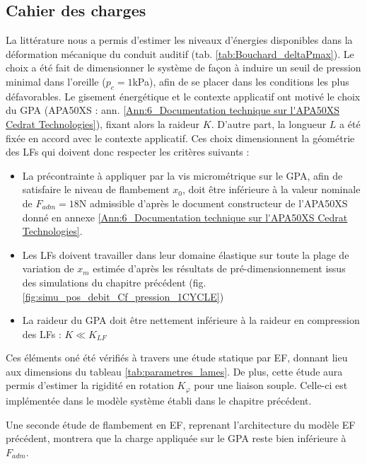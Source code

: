 	\subsection{Cahier des charges}
	\label{subsec:3.4.1:Cahier des charges lames flambees}	
La littérature nous a permis d'estimer les niveaux d'énergies disponibles dans la déformation mécanique du conduit auditif (tab. \ref{tab:Bouchard_deltaPmax}). Le choix a été fait de dimensionner le système de façon à induire un seuil de pression minimal dans l'oreille ($p_c=1$kPa), afin de se placer dans les conditions les plus défavorables. Le gisement énergétique et le contexte applicatif ont motivé le choix du GPA (APA50XS : ann. \ref{Ann:6_Documentation technique sur l'APA50XS Cedrat Technologies}), fixant alors la raideur $K$. D'autre part, la longueur $L$ a été fixée en accord avec le contexte applicatif. Ces choix dimensionnent la géométrie des LFs qui doivent donc respecter les critères suivants :
\begin{itemize}[label=$\circ$]
	\item La précontrainte à appliquer par la vis micrométrique sur le GPA, afin de satisfaire le niveau de flambement $x_0$, doit être inférieure à la valeur nominale de $F_{adm}=18$N admissible d'après le document constructeur de l'APA50XS donné en annexe \ref{Ann:6_Documentation technique sur l'APA50XS Cedrat Technologies}.
	\item Les LFs doivent travailler dans leur domaine élastique sur toute la plage de variation de $x_m$ estimée d'après les résultats de pré-dimensionnement issus des simulations du chapitre précédent (fig. \ref{fig:simu_pos_debit_Cf_pression_1CYCLE})
	\item La raideur du GPA doit être nettement inférieure à la raideur en compression des LFs : $K \ll K_{LF}$
\end{itemize}

Ces éléments oné été vérifiés à travers une étude statique par EF, donnant lieu aux dimensions du tableau \ref{tab:parametres_lames}. De plus, cette étude aura permis d'estimer la rigidité en rotation $K_{\varphi}$ pour une liaison souple. Celle-ci est implémentée dans le modèle système établi dans le chapitre précédent.
 
Une seconde étude de flambement en EF, reprenant l'architecture du modèle EF précédent, montrera que la charge appliquée sur le GPA reste bien inférieure à $F_{adm}$.
 
